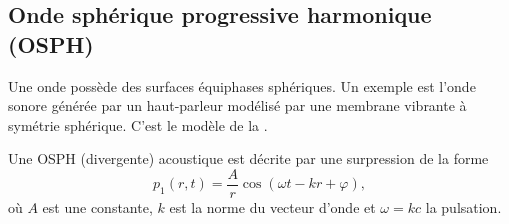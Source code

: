 \documentclass[12pt,fancy]{cours}
\begin{document}

\subsection{Onde sphérique progressive harmonique (OSPH)} 
Une onde  possède des surfaces équiphases sphériques.
Un exemple est l'onde sonore générée par un haut-parleur modélisé par une membrane vibrante à symétrie sphérique. C'est le modèle de la . 
\begin{theorem}\label{form:}
	Une OSPH (divergente) acoustique est décrite par une surpression de la forme
	\begin{equation*}
		 p_1(r,t)=\frac{A}{r}\cos(\omega t-kr+\varphi),
	\end{equation*}
	où $A$ est une constante, $k$ est la norme du vecteur d'onde et $\omega = k c$  la pulsation.
\end{theorem}
\end{document}
